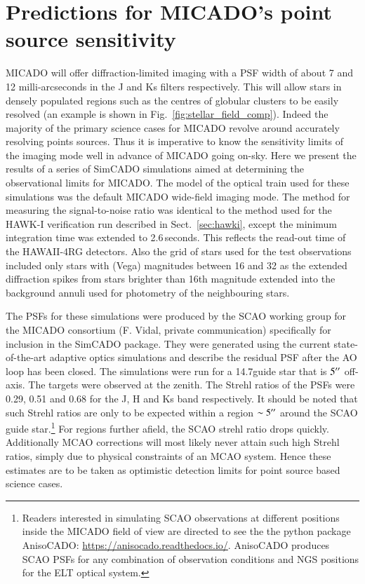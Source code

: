 \section{Predictions for MICADO's point source sensitivity}
\label{sec:predictions}

MICADO will offer diffraction-limited imaging with a PSF width of about 7 and 12 milli-arcseconds in the J and Ks filters respectively. This will allow stars in densely populated regions such as the centres of globular clusters to be easily resolved (an example is shown in Fig.~\ref{fig:stellar_field_comp}). Indeed the majority of the primary science cases for MICADO revolve around accurately resolving points sources. Thus it is imperative to know the sensitivity limits of the imaging mode well in advance of MICADO going on-sky. Here we present the results of a series of SimCADO simulations aimed at determining the observational limits for MICADO. The model of the optical train used for these simulations was the default MICADO wide-field imaging mode. The method for measuring the signal-to-noise ratio was identical to the method used for the HAWK-I verification run described in Sect.~\ref{sec:hawki}, except the minimum integration time was extended to 2.6\,seconds. This reflects the read-out time of the HAWAII-4RG detectors. Also the grid of stars used for the test observations included only stars with (Vega) magnitudes between 16 and 32 as the extended diffraction spikes from stars brighter than 16th magnitude extended into the background annuli used for photometry of the neighbouring stars.

The PSFs for these simulations were produced by the SCAO working group for the MICADO consortium (F. Vidal, private communication) specifically for inclusion in the SimCADO package. They were generated using the current state-of-the-art adaptive optics simulations and describe the residual PSF after the AO loop has been closed. The simulations were run for a 14.7\m guide star that is $5^{\prime\prime}$ off-axis. The targets were observed at the zenith. The Strehl ratios of the PSFs were 0.29, 0.51 and 0.68 for the J, H and Ks band respectively. It should be noted that such Strehl ratios are only to be expected within a region $\sim5^{\prime\prime}$ around the SCAO guide star.\footnote{Readers interested in simulating SCAO observations at different positions inside the MICADO field of view are directed to see the the python package AnisoCADO: \url{https://anisocado.readthedocs.io/}. AnisoCADO produces SCAO PSFs for any combination of observation conditions and NGS positions for the ELT optical system.} For regions further afield, the SCAO strehl ratio drops quickly.  Additionally MCAO corrections will most likely never attain such high Strehl ratios, simply due to physical constraints of an MCAO system. Hence these estimates are to be taken as optimistic detection limits for point source based science cases.


